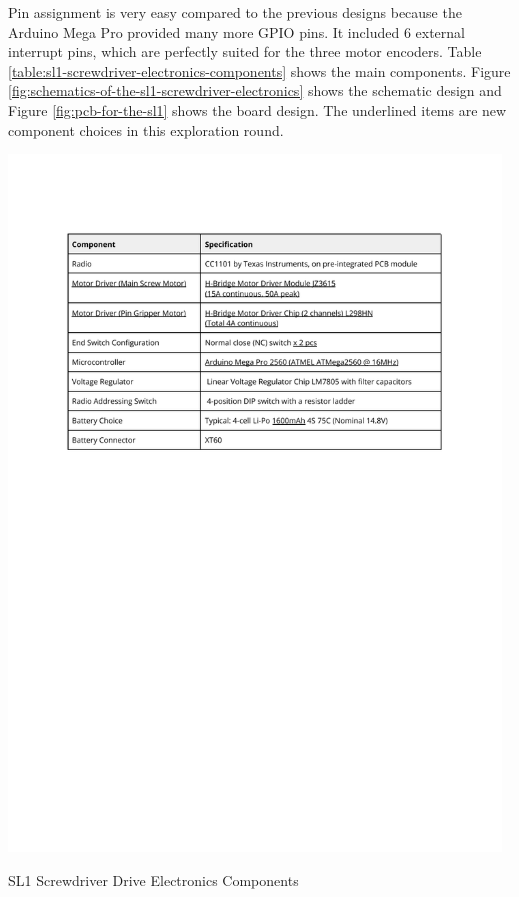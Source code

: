 Pin assignment is very easy compared to the previous designs because the Arduino Mega Pro provided many more GPIO pins. It included 6 external interrupt pins, which are perfectly suited for the three motor encoders.  
Table \ref{table:sl1-screwdriver-electronics-components} shows the main components. Figure \ref{fig:schematics-of-the-sl1-screwdriver-electronics} shows the schematic design and Figure \ref{fig:pcb-for-the-sl1} shows the board design. The underlined items are new component choices in this exploration round. 

\begin{table}[!h]
    \includegraphics[page=1, trim=25.4mm 165mm 25.4mm 33mm, clip, width=0.98\textwidth]{tables/Tables in Chapter 7.pdf}
    \caption{SL1 Screwdriver Drive Electronics Components}
    \label{table:sl1-screwdriver-electronics-components}
\end{table}

